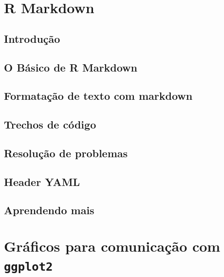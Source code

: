 \documentclass[
]{latex/krantz}
\theoremstyle{definition}
\theoremstyle{definition}
\theoremstyle{definition}
\theoremstyle{definition}
\theoremstyle{remark}
\begin{document}
\hypertarget{r-markdown}{%
\chapter{R Markdown}\label{r-markdown}}

\hypertarget{introduuxe7uxe3o-17}{%
\section{Introdução}\label{introduuxe7uxe3o-17}}

\hypertarget{o-buxe1sico-de-r-markdown}{%
\section{O Básico de R Markdown}\label{o-buxe1sico-de-r-markdown}}

\hypertarget{formatauxe7uxe3o-de-texto-com-markdown}{%
\section{Formatação de texto com markdown}\label{formatauxe7uxe3o-de-texto-com-markdown}}

\hypertarget{trechos-de-cuxf3digo}{%
\section{Trechos de código}\label{trechos-de-cuxf3digo}}

\hypertarget{resoluuxe7uxe3o-de-problemas}{%
\section{Resolução de problemas}\label{resoluuxe7uxe3o-de-problemas}}

\hypertarget{header-yaml}{%
\section{Header YAML}\label{header-yaml}}

\hypertarget{aprendendo-mais-1}{%
\section{Aprendendo mais}\label{aprendendo-mais-1}}

\hypertarget{gruxe1ficos-para-comunicauxe7uxe3o-com-ggplot2}{%
\chapter{\texorpdfstring{Gráficos para comunicação com \texttt{ggplot2}}{Gráficos para comunicação com ggplot2}}\label{gruxe1ficos-para-comunicauxe7uxe3o-com-ggplot2}}
\end{document}
